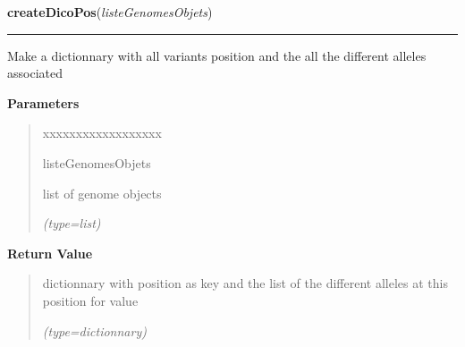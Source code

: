 \hspace{.8\funcindent}\begin{boxedminipage}{\funcwidth}

    \raggedright \textbf{createDicoPos}(\textit{listeGenomesObjets})

    \vspace{-1.5ex}

    \rule{\textwidth}{0.5\fboxrule}
\setlength{\parskip}{2ex}
    Make a dictionnary with all variants position and the all the different
    alleles associated

\setlength{\parskip}{1ex}
      \textbf{Parameters}
      \vspace{-1ex}

      \begin{quote}
        \begin{Ventry}{xxxxxxxxxxxxxxxxxx}

          \item[listeGenomesObjets]

          list of genome objects

            {\it (type=list)}

        \end{Ventry}

      \end{quote}

      \textbf{Return Value}
    \vspace{-1ex}

      \begin{quote}
      dictionnary with position as key and the list of the different 
      alleles at this position for value

      {\it (type=dictionnary)}

      \end{quote}

    \end{boxedminipage}

    \label{script-FixedVar:selectPosSpecifique}

    \vspace{0.5ex}

